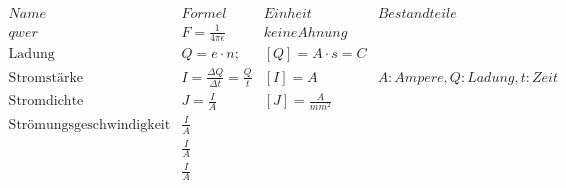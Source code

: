 \begin{math}
    \begin{array}{llll}
        Name                & Formel                                      & Einheit               & Bestandteile \\

        qwer                & F =\frac{ 1 }{ 4 \pi \epsilon }             & keine Ahnung \\
        \text{Ladung}       & Q = e \cdot n ;                             & \left[ Q \right] = A \cdot s = C \\
        \text{Stromstärke}  & I = \frac{\Delta Q}{\Delta t} = \frac{Q}{t} & \left[I\right] = A & A: Ampere, Q: Ladung, t: Zeit \\
        \text{Stromdichte}  & J = \frac{I}{A}                             & \left[J\right] = \frac{A}{mm^2}\\ 
        \text{Strömungsgeschwindigkeit}     &   \frac{I}{A}                                       & \\
        \text{}     &   \frac{I}{A}                                       & \\
        \text{}     &   \frac{I}{A}                                       & \\
    \end{array}
\end{math}